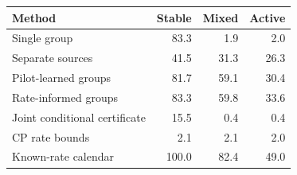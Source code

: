 \begin{tabular}{lrrr}
\toprule
Method & Stable & Mixed & Active \\
\midrule
Single group & 83.3 & 1.9 & 2.0 \\
Separate sources & 41.5 & 31.3 & 26.3 \\
Pilot-learned groups & 81.7 & 59.1 & 30.4 \\
Rate-informed groups & 83.3 & 59.8 & 33.6 \\
Joint conditional certificate & 15.5 & 0.4 & 0.4 \\
CP rate bounds & 2.1 & 2.1 & 2.0 \\
Known-rate calendar & 100.0 & 82.4 & 49.0 \\
\bottomrule
\end{tabular}
